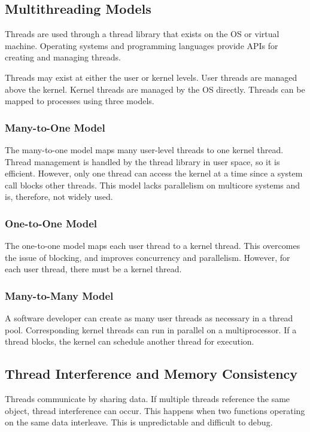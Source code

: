 \subsection{Multithreading Models}

Threads are used through a thread library that exists on the OS or virtual machine.
Operating systems and programming languages provide APIs for creating and managing threads.

Threads may exist at either the user or kernel levels.
User threads are managed above the kernel.
Kernel threads are managed by the OS directly.
Threads can be mapped to processes using three models.

\subsubsection{Many-to-One Model}

The many-to-one model maps many user-level threads to one kernel thread.
Thread management is handled by the thread library in user space, so it is efficient.
However, only one thread can access the kernel at a time since a system call blocks other threads.
This model lacks parallelism on multicore systems and is, therefore, not widely used.

\subsubsection{One-to-One Model}

The one-to-one model maps each user thread to a kernel thread.
This overcomes the issue of blocking, and improves concurrency and parallelism.
However, for each user thread, there must be a kernel thread.

\subsubsection{Many-to-Many Model}

A software developer can create as many user threads as necessary in a thread pool.
Corresponding kernel threads can run in parallel on a multiprocessor.
If a thread blocks, the kernel can schedule another thread for execution.

\subsection{Thread Interference and Memory Consistency}

Threads communicate by sharing data.
If multiple threads reference the same object, thread interference can occur.
This happens when two functions operating on the same data interleave.
This is unpredictable and difficult to debug.

